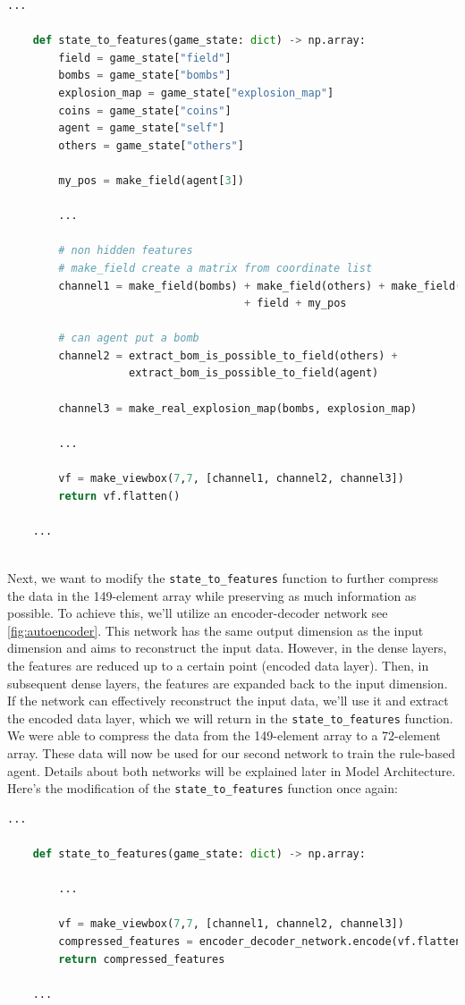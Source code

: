\begin{lstlisting}[language=Python]
    ...

    def state_to_features(game_state: dict) -> np.array:
        field = game_state["field"]
        bombs = game_state["bombs"]
        explosion_map = game_state["explosion_map"]
        coins = game_state["coins"]
        agent = game_state["self"]
        others = game_state["others"]

        my_pos = make_field(agent[3])

        ...

        # non hidden features
        # make_field create a matrix from coordinate list
        channel1 = make_field(bombs) + make_field(others) + make_field(coins) 
                                     + field + my_pos

        # can agent put a bomb
        channel2 = extract_bom_is_possible_to_field(others) +  
                   extract_bom_is_possible_to_field(agent)

        channel3 = make_real_explosion_map(bombs, explosion_map)

        ...

        vf = make_viewbox(7,7, [channel1, channel2, channel3])
        return vf.flatten()

    ...
    
\end{lstlisting}

Next, we want to modify the \verb|state_to_features| function to further compress the data in the 149-element array while preserving as much information as possible. 
To achieve this, we'll utilize an encoder-decoder network see \autoref{fig:autoencoder}. This network has the same output dimension as the 
input dimension and aims to reconstruct the 
input data. However, in the dense layers, the features are reduced up to a certain point (encoded data layer). Then, in subsequent dense layers, the 
features are expanded back to the input dimension. If the network can effectively reconstruct the input data, we'll use it and extract the encoded data layer, 
which we will return in the \verb|state_to_features| function. We were able to compress the data from the 149-element array to a 72-element array. These data will 
now be used for our second network to train the rule-based agent. Details about both networks will be explained later 
in Model Architecture. Here's the modification of the \verb|state_to_features| function once again:

\begin{lstlisting}[language=Python]
    ...

    def state_to_features(game_state: dict) -> np.array:

        ...

        vf = make_viewbox(7,7, [channel1, channel2, channel3])
        compressed_features = encoder_decoder_network.encode(vf.flatten(), 72)
        return compressed_features

    ...

\end{lstlisting}


